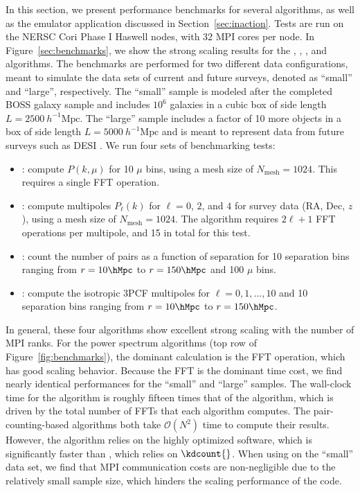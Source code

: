 In this section, we present performance benchmarks for several \nbkit{}
algorithms, as well as the emulator application discussed in
Section~\ref{sec:inaction}. Tests are run on the NERSC Cori Phase I
Haswell nodes, with 32 MPI cores per node. In Figure~\ref{sec:benchmarks}, we
show the strong scaling results for the , ,
, and  algorithms.
The benchmarks are performed for two different data configurations, meant
to simulate the data sets of current and future surveys, denoted
as ``small'' and ``large'', respectively. The ``small'' sample
is modeled after the completed BOSS galaxy sample
\citep{Reid:2016} and includes $10^6$ galaxies in a cubic box of side
length $L = 2500 \ h^{-1}\mathrm{Mpc}$. The ``large'' sample
includes a factor of 10 more objects in a box
of side length $L = 5000 \ h^{-1}\mathrm{Mpc}$ and is meant
to represent data from future surveys such as DESI \citep{DESI:2016}.
We run four sets of benchmarking tests:

\begin{itemize}
  \item {}: compute $P(k,\mu)$ for 10 $\mu$ bins, using a mesh
  size of $N_\mathrm{mesh} = 1024$. This requires a single FFT operation.
  \item {}: compute multipoles $P_\ell(k)$ for
  $\ell=0$, $2$, and $4$ for survey data (RA, Dec, $z$), using a
  mesh size of $N_\mathrm{mesh} = 1024$. The algorithm requires $2\ell+1$
  FFT operations per multipole, and 15 in total for this test.
  \item {}: count the number of pairs as
  a function of separation for
  10 separation bins ranging from $r=10 \hMpc$ to $r=150 \hMpc$ and 100
  $\mu$ bins.
  \item {}: compute the isotropic 3PCF multipoles
  for $\ell=0,1,...,10$ and 10 separation bins ranging from $r=10 \hMpc$ to
  $r=150 \hMpc$.
\end{itemize}

In general, these four algorithms show excellent strong scaling with
the number of MPI ranks. For the power spectrum
algorithms (top row of Figure~\ref{fig:benchmarks}), the
dominant calculation is the FFT operation,
which has good scaling behavior.
Because the FFT is the dominant time cost, we find
nearly identical performances for the ``small'' and ``large'' samples.
The wall-clock time for the  algorithm is roughly
fifteen times that of the  algorithm, which is driven by
the total number of FFTs that each algorithm computes.
The pair-counting-based algorithms both take $\mathcal{O}(N^2)$ time to
compute their results. However, the  algorithm
relies on the highly optimized \Corrfunc{} software, which is significantly
faster than , which relies on $\kdcount{}$.
When using  on the ``small'' data set,
we find that MPI communication costs are non-negligible
due to the relatively small sample size, which hinders the scaling
performance of the code.

